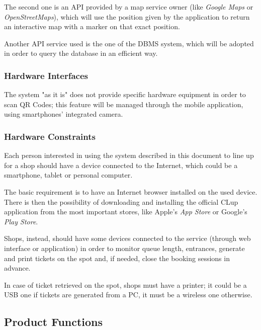 \documentclass[table, 12pt]{article}
\begin{document}
The second one is an API provided by a map service owner (like \textit{Google Maps} or \textit{OpenStreetMaps}), which will use the position given by the application to return an interactive map with a marker on that exact position.

Another API service used is the one of the DBMS system, which will be adopted in order to query the database in an efficient way.
\subsubsection{Hardware Interfaces}
The system "as it is" does not provide specific hardware equipment in order to scan QR Codes; this feature will be managed through the mobile application, using smartphones' integrated camera.
\subsubsection{Hardware Constraints}
Each person interested in using the system described in this document to line up for a shop should have a device connected to the Internet, which could be a smartphone, tablet or personal computer.

The basic requirement is to have an Internet browser installed on the used device.
There is then the possibility of downloading and installing the official CLup application from the most important stores, like Apple's \textit{App Store} or Google's \textit{Play Store}.

Shops, instead, should have some devices connected to the service (through web interface or application) in order to monitor queue length, entrances, generate and print tickets on the spot and, if needed, close the booking sessions in advance.

In case of ticket retrieved on the spot, shops must have a printer; it could be a USB one if tickets are generated from a PC, it must be a wireless one otherwise.

\subsection{Product Functions}
\label{product_functions}
\end{document}
